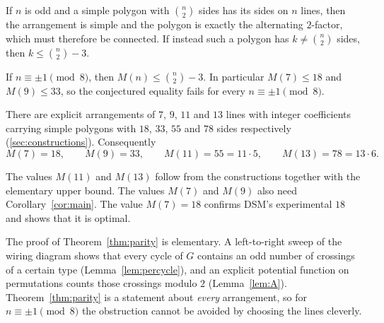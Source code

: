 \begin{theorem}[Reduction]\label{thm:reduction}
If $n$ is odd and a simple polygon with $\binom n2$ sides has its sides on $n$ lines, then the
arrangement is simple and the polygon is exactly the alternating $2$-factor, which must therefore be
connected. If instead such a polygon has $k\neq\binom n2$ sides, then $k\le\binom n2-3$.
\end{theorem}

\begin{corollary}\label{cor:main}
If $n\equiv\pm1\pmod 8$, then $M(n)\le\binom n2-3$. In particular $M(7)\le 18$ and $M(9)\le 33$, so
the conjectured equality fails for every $n\equiv\pm 1\pmod 8$.
\end{corollary}

\begin{theorem}\label{thm:constructions}
There are explicit arrangements of $7$, $9$, $11$ and $13$ lines with integer coefficients carrying
simple polygons with $18$, $33$, $55$ and $78$ sides respectively (\cref{sec:constructions}).
Consequently
\[
  M(7)=18,\qquad M(9)=33,\qquad M(11)=55=11\cdot 5,\qquad M(13)=78=13\cdot 6 .
\]
\end{theorem}

The values $M(11)$ and $M(13)$ follow from the constructions together with the elementary upper bound.
The values $M(7)$ and $M(9)$ also need Corollary~\ref{cor:main}. The value $M(7)=18$ confirms DSM's
experimental $18$ and shows that it is optimal.

The proof of Theorem~\ref{thm:parity} is elementary. A left-to-right sweep of the wiring diagram shows
that every cycle of $G$ contains an odd number of crossings of a certain type (Lemma~\ref{lem:percycle}),
and an explicit potential function on permutations counts those crossings modulo $2$
(Lemma~\ref{lem:A}). Theorem~\ref{thm:parity} is a statement about \emph{every} arrangement, so for
$n\equiv\pm1\pmod 8$ the obstruction cannot be avoided by choosing the lines cleverly.

